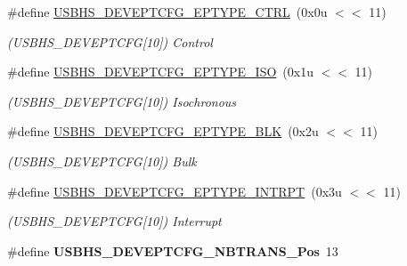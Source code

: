 \begin{DoxyCompactItemize}
\#define \mbox{\hyperlink{group__SAMS70__USBHS_gaad3788fed33d8c54c856093e2f45258f}{U\+S\+B\+H\+S\+\_\+\+D\+E\+V\+E\+P\+T\+C\+F\+G\+\_\+\+E\+P\+T\+Y\+P\+E\+\_\+\+C\+T\+RL}}~(0x0u $<$$<$ 11)
\begin{DoxyCompactList}\small\item\em (U\+S\+B\+H\+S\+\_\+\+D\+E\+V\+E\+P\+T\+C\+FG\mbox{[}10\mbox{]}) Control \end{DoxyCompactList}\item 
\mbox{\label{group__SAMS70__USBHS_ga87d13f79eb203b988827d920c0fb3fb5}} 
\#define \mbox{\hyperlink{group__SAMS70__USBHS_ga87d13f79eb203b988827d920c0fb3fb5}{U\+S\+B\+H\+S\+\_\+\+D\+E\+V\+E\+P\+T\+C\+F\+G\+\_\+\+E\+P\+T\+Y\+P\+E\+\_\+\+I\+SO}}~(0x1u $<$$<$ 11)
\begin{DoxyCompactList}\small\item\em (U\+S\+B\+H\+S\+\_\+\+D\+E\+V\+E\+P\+T\+C\+FG\mbox{[}10\mbox{]}) Isochronous \end{DoxyCompactList}\item 
\mbox{\label{group__SAMS70__USBHS_ga0e7b543add6ac23998dae0d7eb75a5d5}} 
\#define \mbox{\hyperlink{group__SAMS70__USBHS_ga0e7b543add6ac23998dae0d7eb75a5d5}{U\+S\+B\+H\+S\+\_\+\+D\+E\+V\+E\+P\+T\+C\+F\+G\+\_\+\+E\+P\+T\+Y\+P\+E\+\_\+\+B\+LK}}~(0x2u $<$$<$ 11)
\begin{DoxyCompactList}\small\item\em (U\+S\+B\+H\+S\+\_\+\+D\+E\+V\+E\+P\+T\+C\+FG\mbox{[}10\mbox{]}) Bulk \end{DoxyCompactList}\item 
\mbox{\label{group__SAMS70__USBHS_ga7ebf575146574754d0803f2fe597888d}} 
\#define \mbox{\hyperlink{group__SAMS70__USBHS_ga7ebf575146574754d0803f2fe597888d}{U\+S\+B\+H\+S\+\_\+\+D\+E\+V\+E\+P\+T\+C\+F\+G\+\_\+\+E\+P\+T\+Y\+P\+E\+\_\+\+I\+N\+T\+R\+PT}}~(0x3u $<$$<$ 11)
\begin{DoxyCompactList}\small\item\em (U\+S\+B\+H\+S\+\_\+\+D\+E\+V\+E\+P\+T\+C\+FG\mbox{[}10\mbox{]}) Interrupt \end{DoxyCompactList}\item 
\mbox{\label{group__SAMS70__USBHS_gae6c3134ced9c4452ebe91f53567813b7}} 
\#define {\bfseries U\+S\+B\+H\+S\+\_\+\+D\+E\+V\+E\+P\+T\+C\+F\+G\+\_\+\+N\+B\+T\+R\+A\+N\+S\+\_\+\+Pos}~13

\end{DoxyCompactItemize}
